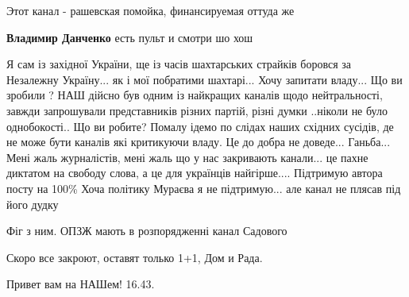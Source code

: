  
 
 
 
 
\zzSecCmt

\begin{itemize} %
Этот канал - рашевская помойка, финансируемая оттуда же

\textbf{Владимир Данченко} есть пульт и смотри шо хош


Я сам із західної України, ще із часів шахтарських страйків боровся за
Незалежну Україну... як і мої побратими шахтарі... Хочу запитати владу... Що ви
зробили ? НАШ дійсно був одним із найкращих каналів щодо нейтральності, завжди
запрошували представників різних партій, різні думки ..ніколи не було
однобокості.. Що ви робите? Помалу ідемо по слідах наших східних сусідів, де не
може бути каналів які критикуючи владу. Це до добра не доведе... Ганьба... Мені
жаль журналістів, мені жаль що у нас закривають канали... це пахне диктатом на
свободу слова, а це для українців найгірше.... Підтримую автора посту на 100\%
Хоча політику Мураєва я не підтримую... але канал не плясав під його дудку

Фіг з ним. ОПЗЖ мають в розпорядженні канал Садового

Скоро все закроют, оставят только 1+1, Дом и Рада.

Привет вам на НАШем! 16.43.
\end{itemize} %
